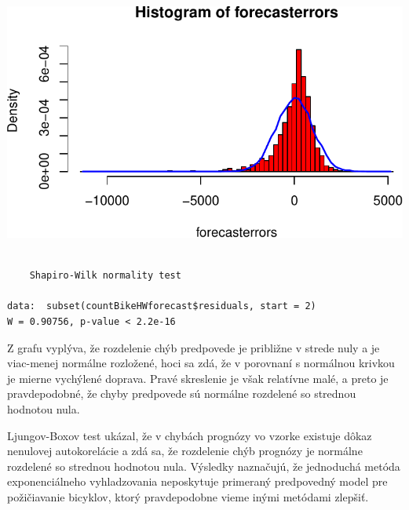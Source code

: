 \documentclass[
  letterpaper,
  DIV=11,
  numbers=noendperiod]{scrreprt}
\newenvironment{Shaded}{\begin{snugshade}}{\end{snugshade}}
\newcommand{\AttributeTok}[1]{\textcolor[rgb]{0.40,0.45,0.13}{#1}}
\newcommand{\DecValTok}[1]{\textcolor[rgb]{0.68,0.00,0.00}{#1}}
\newcommand{\FunctionTok}[1]{\textcolor[rgb]{0.28,0.35,0.67}{#1}}
\newcommand{\NormalTok}[1]{\textcolor[rgb]{0.00,0.23,0.31}{#1}}
\newcommand{\SpecialCharTok}[1]{\textcolor[rgb]{0.37,0.37,0.37}{#1}}
\begin{document}
\begin{Shaded}
\end{Shaded}

\includegraphics{prednaska2_HoltWinters_files/figure-pdf/unnamed-chunk-15-1.pdf}

\begin{Shaded}
\end{Shaded}

\begin{verbatim}

    Shapiro-Wilk normality test

data:  subset(countBikeHWforecast$residuals, start = 2)
W = 0.90756, p-value < 2.2e-16
\end{verbatim}

Z grafu vyplýva, že rozdelenie chýb predpovede je približne v strede
nuly a je viac-menej normálne rozložené, hoci sa zdá, že v porovnaní s
normálnou krivkou je mierne vychýlené doprava. Pravé skreslenie je však
relatívne malé, a preto je pravdepodobné, že chyby predpovede sú
normálne rozdelené so strednou hodnotou nula.

Ljungov-Boxov test ukázal, že v chybách prognózy vo vzorke existuje
dôkaz nenulovej autokorelácie a zdá sa, že rozdelenie chýb prognózy je
normálne rozdelené so strednou hodnotou nula. Výsledky naznačujú, že
jednoduchá metóda exponenciálneho vyhladzovania neposkytuje primeraný
predpovedný model pre požičiavanie bicyklov, ktorý pravdepodobne vieme
inými metódami zlepšiť.
\end{document}
